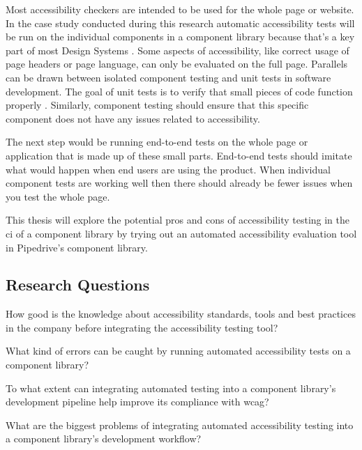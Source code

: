 \documentclass{master_thesis}
\begin{document}
Most accessibility checkers are intended to be used for the whole page or website. In the case study conducted during this research automatic accessibility tests will be run on the individual components in a component library because that's a key part of most Design Systems \citep{Yew2020}. Some aspects of accessibility, like correct usage of page headers or page language, can only be evaluated on the full page. Parallels can be drawn between isolated component testing and unit tests in software development. The goal of unit tests is to verify that small pieces of code function properly \citep[p.60]{Humble2010}. Similarly, component testing should ensure that this specific component does not have any issues related to accessibility.

The next step would be running end-to-end tests on the whole page or application that is made up of these small parts. End-to-end tests should imitate what would happen when end users are using the product. When individual component tests are working well then there should already be fewer issues when you test the whole page.

This thesis will explore the potential pros and cons of accessibility testing in the \ac{ci} of a component library by trying out an automated accessibility evaluation tool in Pipedrive's component library.

\subsection{Research Questions}

	\begin{RQlist}
		\item How good is the knowledge about accessibility standards, tools and best practices in the company before integrating the accessibility testing tool?
		\item What kind of errors can be caught by running automated accessibility tests on a component library?
		\item To what extent can integrating automated testing into a component library's development pipeline help improve its compliance with \ac{wcag}?
		\item What are the biggest problems of integrating automated accessibility testing into a component library's development workflow?
	\end{RQlist}
\end{document}
